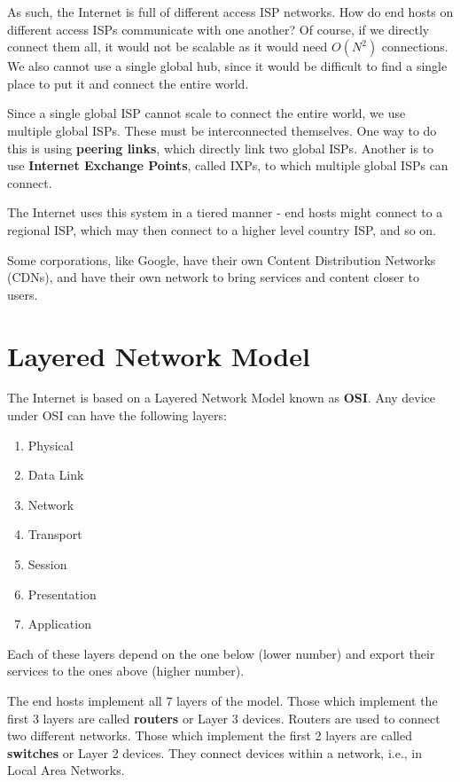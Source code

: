 \documentclass[12pt,letterpaper]{amsbook}
\theoremstyle{definition}
\begin{document}
As such, the Internet is full of different access ISP networks. How do end hosts on different access ISPs communicate with one another? Of course, if we directly connect them all, it would not be scalable as it would need $O(N^2)$ connections. We also cannot use a single global hub, since it would be difficult to find a single place to put it and connect the entire world.

Since a single global ISP cannot scale to connect the entire world, we use multiple global ISPs. These must be interconnected themselves. One way to do this is using \textbf{peering links}, which directly link two global ISPs. Another is to use \textbf{Internet Exchange Points}, called IXPs, to which multiple global ISPs can connect.

The Internet uses this system in a tiered manner - end hosts might connect to a regional ISP, which may then connect to a higher level country ISP, and so on.

Some corporations, like Google, have their own Content Distribution Networks (CDNs), and have their own network to bring services and content closer to users.

\section{Layered Network Model}

The Internet is based on a Layered Network Model known as \textbf{OSI}. Any device under OSI can have the following layers:

\begin{enumerate}
  \item Physical
  \item Data Link
  \item Network
  \item Transport
  \item Session
  \item Presentation
  \item Application
\end{enumerate}

Each of these layers depend on the one below (lower number) and export their services to the ones above (higher number).

The end hosts implement all 7 layers of the model. Those which implement the first 3 layers are called \textbf{routers} or Layer 3 devices. Routers are used to connect two different networks. Those which implement the first 2 layers are called \textbf{switches} or Layer 2 devices. They connect devices within a network, i.e., in Local Area Networks.
\end{document}
